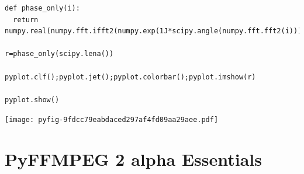 \documentclass{report}
\begin{document}
\begin{lstlisting}
def phase_only(i):
  return numpy.real(numpy.fft.ifft2(numpy.exp(1J*scipy.angle(numpy.fft.fft2(i)))))

r=phase_only(scipy.lena())

pyplot.clf();pyplot.jet();pyplot.colorbar();pyplot.imshow(r)

pyplot.show()

\end{lstlisting}















\noindent
\texttt{[image: pyfig-9fdcc79eabdaced297af4fd09aa29aee.pdf]}



















\section{PyFFMPEG 2 alpha Essentials}
\end{document}
